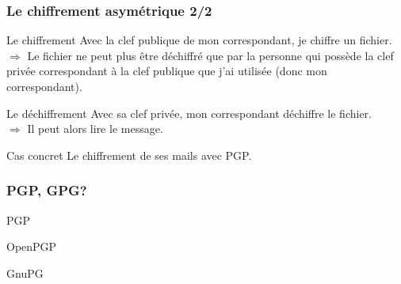 \documentclass{beamer}
\begin{document}
\begin{frame}
\frametitle{Le chiffrement asymétrique 2/2}

\begin{block}{Le chiffrement}
Avec la clef publique de mon correspondant, je chiffre  un fichier.
\\$\Rightarrow$ Le fichier ne peut plus être déchiffré que par la personne qui possède la clef privée correspondant à la clef publique que j'ai utilisée (donc mon correspondant).
\end{block}

\begin{block}{Le déchiffrement}
Avec sa clef privée,  mon correspondant déchiffre le fichier.
\\
$\Rightarrow$ Il peut alors lire le message.
\end{block}

\begin{block}{Cas concret}
Le chiffrement de ses mails avec PGP.
\end{block}
\end{frame}

\begin{frame}
\frametitle{PGP, GPG?}
\begin{block}{PGP}
\end{block}
\begin{block}{OpenPGP}
\end{block}
\begin{block}{GnuPG}
\end{block}
\end{frame}
\end{document}
